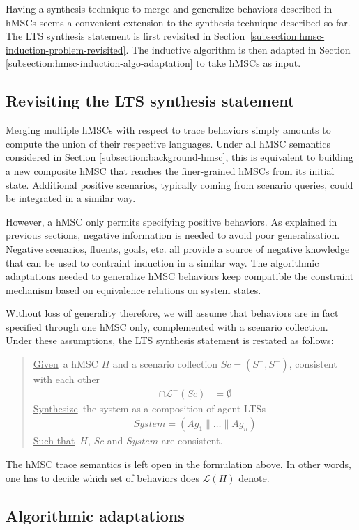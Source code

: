 Having a synthesis technique to merge and generalize behaviors described in hMSCs seems a convenient extension to the synthesis technique described so far. The LTS synthesis statement is first revisited in Section~\ref{subsection:hmsc-induction-problem-revisited}. The inductive algorithm is then adapted in Section \ref{subsection:hmsc-induction-algo-adaptation} to take hMSCs as input.

\subsection{Revisiting the LTS synthesis statement\label{subsection:hmsc-induction-problem-revisited}}

Merging multiple hMSCs with respect to trace behaviors simply amounts to compute the union of their respective languages. Under all hMSC semantics considered in Section \ref{subsection:background-hmsc}, this is equivalent to building a new composite hMSC that reaches the finer-grained hMSCs from its initial state. Additional positive scenarios, typically coming from scenario queries, could be integrated in a similar way.  

However, a hMSC only permits specifying positive behaviors. As explained in previous sections, negative information is needed to avoid poor generalization. Negative scenarios, fluents, goals, etc. all provide a source of negative knowledge that can be used to contraint induction in a similar way. The algorithmic adaptations needed to generalize hMSC behaviors keep compatible the constraint mechanism based on equivalence relations on system states. 

Without loss of generality therefore, we will assume that behaviors are in fact specified through one hMSC only, complemented with a scenario collection. Under these assumptions, the LTS synthesis statement is restated as follows: 

\begin{quote}
\underline{Given}~a hMSC $H$ and a scenario collection $Sc = (S^+,S^-)$, consistent with each other
\begin{align*}
[\mathcal{L}^+(Sc) \cup \mathcal{L}(H)] \cap \mathcal{L}^-(Sc) &= \emptyset
\end{align*}
\underline{Synthesize}~the system as a composition of agent LTSs
\begin{align*}
System = (Ag_1 \parallel \ldots \parallel Ag_n)
\end{align*}
\underline{Such that}~$H$, $Sc$ and $System$ are consistent.
\end{quote}

The hMSC trace semantics is left open in the formulation above. In other words, one has to decide which set of behaviors does $\mathcal{L}(H)$ denote. 

\subsection{Algorithmic adaptations\label{subsection:hmsc-induction-algo-adaptation}}

